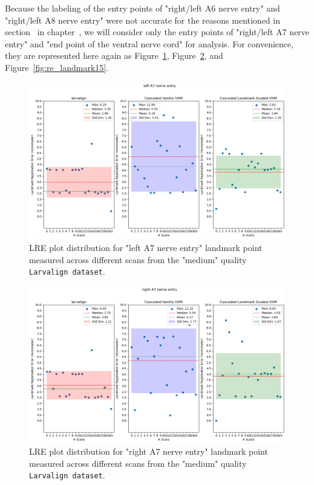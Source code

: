 \documentclass{book}
\begin{document}
	Because the labeling of the entry points of "right/left A6 nerve entry" and "right/left A8 nerve entry" were not accurate for the reasons mentioned in section~ in chapter~, we will consider only the entry points of "right/left A7 nerve entry" and "end point of the ventral nerve cord" for analysis. For convenience, they are represented here again as Figure~\ref{fig:re_landmark22}, Figure~\ref{fig:re_landmark27}, and Figure~\ref{fig:re_landmark15}.
	
	\begin{figure}[h!]
		\centering
		\includegraphics[width=0.9\columnwidth]{resources/chapter5_fresh/output/left A7 nerve entry.png}
		\caption{LRE plot distribution for "left A7 nerve entry" landmark point measured across different scans from the "medium" quality \texttt{Larvalign dataset}.}
		\label{fig:re_landmark22}
	\end{figure}
	
	\begin{figure}[h!]
		\centering
		\includegraphics[width=0.9\columnwidth]{resources/chapter5_fresh/output/right A7 nerve entry.png}
		\caption{LRE plot distribution for "right A7 nerve entry" landmark point measured across different scans from the "medium" quality \texttt{Larvalign dataset}.}
		\label{fig:re_landmark27}
	\end{figure}
	
\end{document}
